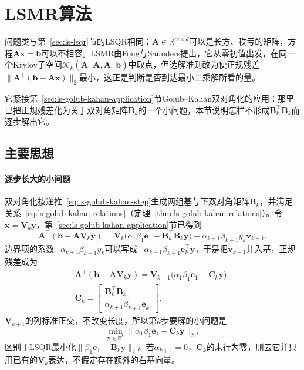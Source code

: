 \section{LSMR算法}
\label{sec:ls-lsmr}

问题类与第~\ref{sec:ls-lsqr}节的LSQR相同：$\bm A\in\mathbb R^{m\times d}$可以是长方、秩亏的矩阵，方程$\bm A\bm x=\bm b$可以不相容。LSMR由Fong与Saunders提出，它从零初值出发，在同一个Krylov子空间$\mathcal K_k(\bm A^\top\bm A,\bm A^\top\bm b)$中取点，但选解准则改为使正规残差$\lVert\bm A^\top(\bm b-\bm A\bm x)\rVert_2$最小，这正是判断是否到达最小二乘解所看的量。

它紧接第~\ref{sec:ls-golub-kahan-application}节Golub--Kahan双对角化的应用：那里已把正规残差化为关于双对角矩阵$\bm B_k$的一个小问题，本节说明怎样不形成$\bm B_k^\top\bm B_k$而逐步解出它。

\subsection{主要思想}

\paragraph{逐步长大的小问题}
双对角化按递推~\eqref{eq:ls-golub-kahan-step}生成两组基与下双对角矩阵$\bm B_k$，并满足关系~\eqref{eq:ls-golub-kahan-relations}（定理~\ref{thm:ls-golub-kahan-relations}）。令$\bm x=\bm V_k\bm y$，第~\ref{sec:ls-golub-kahan-application}节已得到
\[
 \bm A^\top(\bm b-\bm A\bm V_k\bm y)
 =\bm V_k\bigl(\alpha_1\beta_1\bm e_1-\bm B_k^\top\bm B_k\bm y\bigr)-\alpha_{k+1}\beta_{k+1}y_k\bm v_{k+1}.
\]
边界项的系数$-\alpha_{k+1}\beta_{k+1}y_k$可以写成$-\alpha_{k+1}\beta_{k+1}\bm e_k^\top\bm y$，于是把$\bm v_{k+1}$并入基，正规残差成为
\begin{equation}
 \begin{gathered}
 \bm A^\top(\bm b-\bm A\bm V_k\bm y)
 =\bm V_{k+1}\bigl(\alpha_1\beta_1\bm e_1-\bm C_k\bm y\bigr),\\
 \bm C_k=\begin{bmatrix}\bm B_k^\top\bm B_k\\ \alpha_{k+1}\beta_{k+1}\bm e_k^\top\end{bmatrix}.
 \end{gathered}
 \label{eq:ls-lsmr-subproblem}
\end{equation}
$\bm V_{k+1}$的列标准正交，不改变长度，所以第$k$步要解的小问题是
\[
 \min_{\bm y\in\mathbb R^k}\lVert\alpha_1\beta_1\bm e_1-\bm C_k\bm y\rVert_2 ,
\]
区别于LSQR最小化$\lVert\beta_1\bm e_1-\bm B_k\bm y\rVert_2$。若$\alpha_{k+1}=0$，$\bm C_k$的末行为零，删去它并只用已有的$\bm V_k$表达，不假定存在额外的右基向量。

